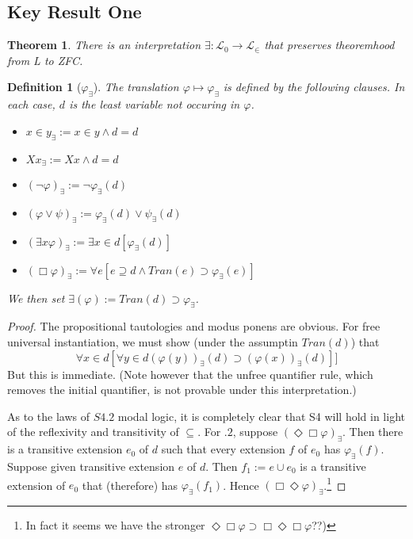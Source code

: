 \documentclass{article}
\newtheorem{definition}{Definition}
\newtheorem{theorem}{Theorem}
\begin{document}
\subsection{Key Result One}
\begin{theorem} 
There is an interpretation $\exists : \mathcal{L}_0 \to \mathcal{L}_\in$ that preserves 
theoremhood from L to ZFC.
\end{theorem}
\begin{definition}[$\varphi_\exists$]
    The translation $\varphi \mapsto \varphi_\exists$ is defined by the following clauses.
    In each case, $d$ is the least variable not occuring in $\varphi$.
    \begin{itemize}
        \item $x \in y_\exists := x \in y \wedge d = d$
        \item $Xx_\exists := Xx \wedge d = d$
        \item $(\neg \varphi)_\exists := \neg \varphi_\exists(d)$
        \item $(\varphi \vee \psi)_\exists := \varphi_\exists(d) \vee \psi_\exists(d)$
        \item $(\exists x \varphi)_\exists := \exists x \in d[ \varphi_\exists(d)]$
        \item $(\Box \varphi)_\exists := \forall e[e \supseteq d \wedge Tran(e) \supset \varphi_\exists(e)]$
    \end{itemize}
    We then set $\exists(\varphi) := Tran(d) \supset \varphi_\exists$.
\end{definition}
\begin{proof}
    The propositional tautologies and modus ponens are obvious. For free universal 
    instantiation, we must show (under the assumptin $Tran(d)$) that
    $$\forall x \in d [ \forall y \in d (\varphi(y))_\exists (d) \supset (\varphi(x))_\exists(d)]]$$
    But this is immediate. (Note however that the unfree quantifier rule,
    which removes the initial quantifier, is not provable 
    under this interpretation.)

    As to the laws of $S4.2$ modal logic, it is completely clear that S4 will hold 
    in light of the reflexivity and transitivity of $\subseteq$. For $.2$, suppose 
    $(\Diamond \Box \varphi)_\exists$. Then there is a transitive extension $e_0$ of $d$ 
    such that every extension $f$ of $e_0$ has $\varphi_\exists(f)$. Suppose given 
    transitive extension $e$ of $d$. Then $f_1 := e \cup e_0$ is a transitive extension 
    of $e_0$ that (therefore) has $\varphi_\exists(f_1)$. Hence $(\Box \Diamond \varphi)_\exists$.\footnote{
        In fact it seems we have the stronger $\Diamond \Box \varphi \supset \Box \Diamond \Box \varphi$??)
    }
    
\end{proof}
\end{document}
